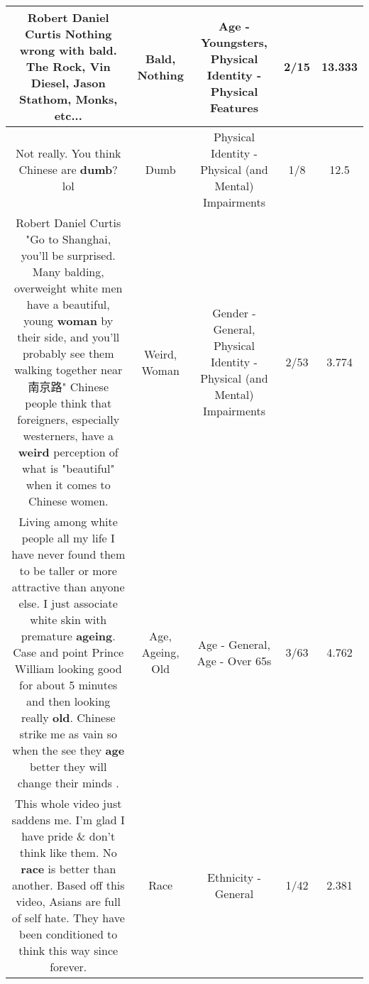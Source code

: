 \documentclass[11pt]{article}
\newlength\mylength
\begin{document}
\begin{center}
\begin{longtable}{|C{.65\mylength}|C{.30\mylength}|C{.12\mylength}|C{.12\mylength}|C{.12\mylength}|}
  \small Robert Daniel Curtis \textbf{Nothing} wrong with \textbf{bald}. The Rock, Vin Diesel, Jason Stathom, Monks, etc...\normalsize   & Bald, Nothing & Age - Youngsters, Physical Identity - Physical Features & 2/15 & 13.333 \\  \hline
  \small Not really. You think Chinese are \textbf{dumb}? lol\normalsize   & Dumb & Physical Identity - Physical (and Mental) Impairments & 1/8 & 12.5 \\  \hline
  \small Robert Daniel Curtis "Go to Shanghai, you'll be surprised. Many balding, overweight white men have a beautiful, young \textbf{woman} by their side, and you'll probably see them walking together near 南京路"  Chinese people think that foreigners, especially westerners, have a \textbf{weird} perception of what is "beautiful" when it comes to Chinese women.\normalsize   & Weird, Woman & Gender - General, Physical Identity - Physical (and Mental) Impairments & 2/53 & 3.774 \\  \hline
  \small Living among white people all my life I have never found them to be taller or more attractive than anyone else. I just associate white skin with premature \textbf{ageing}. Case and point Prince William looking good for about 5 minutes and then looking really \textbf{old}. Chinese strike me as vain so when the see they \textbf{age} better they will change their minds .\normalsize   & Age, Ageing, Old & Age - General, Age - Over 65s & 3/63 & 4.762 \\  \hline
  \small This whole video just saddens me. I'm glad I have pride \& don't think like them. No \textbf{race} is better than another. Based off this video, Asians are full of self hate. They have been conditioned to think this way since forever.\normalsize   & Race & Ethnicity - General & 1/42 & 2.381 \\  \hline

\end{longtable}
\end{center}
\end{document}
